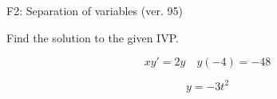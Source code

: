 \begin{exercise}
  \begin{exerciseTitle}F2: Separation of variables (ver. 95)\end{exerciseTitle}
  \begin{exerciseStatement}
    
Find the solution to the given IVP.

    
\[xy'= 2 y \hspace{1em} y( -4 ) = -48\]

  \end{exerciseStatement}
  \begin{exerciseAnswer}
    
\[y= -3 t^ 2\]

  \end{exerciseAnswer}
\end{exercise}